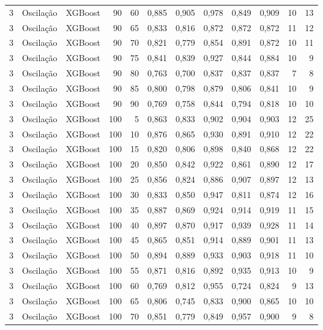 \begin{longtable}{@{}rllrrrrrrrrr@{}}
3 & Oscilação & XGBoost & 90 & 60 & 0,885 & 0,905 & 0,978 & 0,849 & 0,909 & 10 & 13 \\
3 & Oscilação & XGBoost & 90 & 65 & 0,833 & 0,816 & 0,872 & 0,872 & 0,872 & 11 & 12 \\
3 & Oscilação & XGBoost & 90 & 70 & 0,821 & 0,779 & 0,854 & 0,891 & 0,872 & 10 & 11 \\
3 & Oscilação & XGBoost & 90 & 75 & 0,841 & 0,839 & 0,927 & 0,844 & 0,884 & 10 & 9 \\
3 & Oscilação & XGBoost & 90 & 80 & 0,763 & 0,700 & 0,837 & 0,837 & 0,837 & 7 & 8 \\
3 & Oscilação & XGBoost & 90 & 85 & 0,800 & 0,798 & 0,879 & 0,806 & 0,841 & 10 & 9 \\
3 & Oscilação & XGBoost & 90 & 90 & 0,769 & 0,758 & 0,844 & 0,794 & 0,818 & 10 & 10 \\
3 & Oscilação & XGBoost & 100 & 5 & 0,863 & 0,833 & 0,902 & 0,904 & 0,903 & 12 & 25 \\
3 & Oscilação & XGBoost & 100 & 10 & 0,876 & 0,865 & 0,930 & 0,891 & 0,910 & 12 & 22 \\
3 & Oscilação & XGBoost & 100 & 15 & 0,820 & 0,806 & 0,898 & 0,840 & 0,868 & 12 & 22 \\
3 & Oscilação & XGBoost & 100 & 20 & 0,850 & 0,842 & 0,922 & 0,861 & 0,890 & 12 & 17 \\
3 & Oscilação & XGBoost & 100 & 25 & 0,856 & 0,824 & 0,886 & 0,907 & 0,897 & 12 & 13 \\
3 & Oscilação & XGBoost & 100 & 30 & 0,833 & 0,850 & 0,947 & 0,811 & 0,874 & 12 & 16 \\
3 & Oscilação & XGBoost & 100 & 35 & 0,887 & 0,869 & 0,924 & 0,914 & 0,919 & 11 & 15 \\
3 & Oscilação & XGBoost & 100 & 40 & 0,897 & 0,870 & 0,917 & 0,939 & 0,928 & 11 & 14 \\
3 & Oscilação & XGBoost & 100 & 45 & 0,865 & 0,851 & 0,914 & 0,889 & 0,901 & 11 & 13 \\
3 & Oscilação & XGBoost & 100 & 50 & 0,894 & 0,889 & 0,933 & 0,903 & 0,918 & 11 & 10 \\
3 & Oscilação & XGBoost & 100 & 55 & 0,871 & 0,816 & 0,892 & 0,935 & 0,913 & 10 & 9 \\
3 & Oscilação & XGBoost & 100 & 60 & 0,769 & 0,812 & 0,955 & 0,724 & 0,824 & 9 & 13 \\
3 & Oscilação & XGBoost & 100 & 65 & 0,806 & 0,745 & 0,833 & 0,900 & 0,865 & 10 & 10 \\
3 & Oscilação & XGBoost & 100 & 70 & 0,851 & 0,779 & 0,849 & 0,957 & 0,900 & 9 & 8 \\

\end{longtable}
